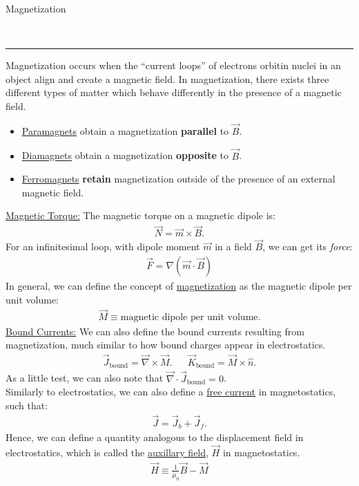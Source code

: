 \documentclass{article}
\newcommand{\header}[1]{\begin{large}\noindent #1\end{large}\\\rule{\textwidth}{0.5pt}}
\newcommand{\gap}{\medskip\\}
\newcommand{\sheader}[1]{\underline{#1:}}
\begin{document}
\header{Magnetization}
Magnetization occurs when the ``current loops'' of electrons orbitin nuclei in an object
align and create a magnetic field. In magnetization, there exists three different types of 
matter which behave differently in the presence of a magnetic field.
\begin{itemize}
    \item \underline{Paramagnets} obtain a magnetization \textbf{parallel} to $\vec{B}$.
    \item \underline{Diamagnets} obtain a magnetization \textbf{opposite} to $\vec{B}$.
    \item \underline{Ferromagnets} \textbf{retain} magnetization outside of the presence 
    of an external magnetic field.
\end{itemize}
\sheader{Magnetic Torque} The magnetic torque on a magnetic dipole is:
\begin{align*}
    \vec{N} = \vec{m} \times \vec{B}.
\end{align*}
For an infinitesimal loop, with dipole moment $\vec{m}$ in a field $\vec{B}$, we can get 
its \textit{force}:
\begin{align*}
    \vec{F} = \nabla(\vec{m} \cdot \vec{B})
\end{align*}
In general, we can define the concept of \underline{magnetization} as the magnetic dipole 
per unit volume:
\begin{align*}
    \vec{M} \equiv \textrm{magnetic dipole per unit volume.}
\end{align*}
\sheader{Bound Currents} We can also define the bound currents resulting from magnetization, 
much similar to how bound charges appear in electrostatics.
\begin{align*}
    \vec{J}_\textrm{bound} = \vec{\nabla} \times \vec{M}. && \vec{K}_\textrm{bound} = \vec{M} \times \hat{n}.
\end{align*}
As a little test, we can also note that $\vec{\nabla} \cdot \vec{J}_\textrm{bound} = 0$.
\gap
Similarly to electrostatics, we can also define a \underline{free current} in magnetostatics,
such that:
\begin{align*}
    \vec{J} = \vec{J}_b + \vec{J}_f.
\end{align*}
Hence, we can define a quantity analogous to the displacement field in electrostatics, 
which is called the \underline{auxillary field}, $\vec{H}$ in magnetostatics.
\begin{align*}
    \vec{H} \equiv \frac{1}{\mu_0}\vec{B} - \vec{M}
\end{align*}
\end{document}
